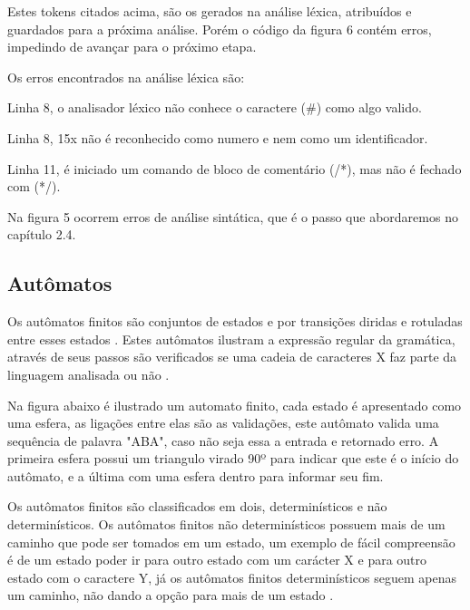 \documentclass[12pt,oneside,a4paper,chapter=TITLE,section=TITLE,sumario=tradicional]{abntex2}
\begin{document}
Estes tokens citados acima, são os gerados na análise léxica, atribuídos e guardados para a próxima análise. Porém o código da figura 6 contém erros, impedindo de avançar para o próximo etapa.

Os erros encontrados na análise léxica são:

\begin{lista}
	\item Linha 8, o analisador léxico não conhece o caractere (\#) como algo valido.
	\item Linha 8, 15x não é reconhecido como numero e nem como um identificador.
	\item Linha 11, é iniciado um comando de bloco de comentário (/*), mas não é fechado com (*/).
\end{lista}

Na figura 5 ocorrem erros de análise sintática, que é o passo que abordaremos no capítulo 2.4.

\subsection{Autômatos}
\label{sec:automatos}

Os autômatos finitos são conjuntos de estados e por transições diridas e rotuladas entre esses estados \cite{pedro2018}. Estes autômatos ilustram a expressão regular da gramática, através de seus passos são verificados se uma cadeia de caracteres X faz parte da linguagem analisada ou não \cite{alfred1995}.

Na figura abaixo é ilustrado um automato finito, cada estado é apresentado como uma esfera, as ligações entre elas são as validações, este autômato valida uma sequência de palavra "ABA", caso não seja essa a entrada e retornado erro. A primeira esfera possui um triangulo virado 90º para indicar que este é o início do autômato, e a última com uma esfera dentro para informar seu fim.

\begin{figure}[htb]
\end{figure}

Os autômatos finitos são classificados em dois, determinísticos e não determinísticos. Os autômatos finitos não determinísticos possuem mais de um caminho que pode ser tomados em um estado, um exemplo de fácil compreensão é de um estado poder ir para outro estado com um carácter X e para outro estado com o caractere Y, já os autômatos finitos determinísticos seguem apenas um caminho, não dando a opção para mais de um estado \cite{alfred1995}.
\end{document}
